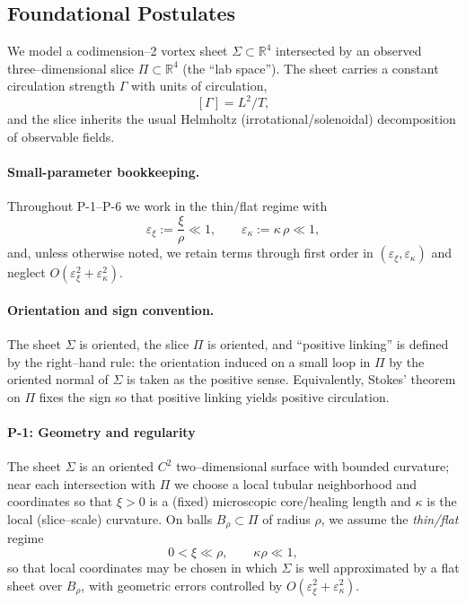 \subsection{Foundational Postulates}
\label{sec:foundational-postulates}

We model a codimension–2 vortex sheet $\Sigma\subset\mathbb{R}^4$ intersected by an observed three–dimensional slice $\Pi\subset\mathbb{R}^4$ (the “lab space”). The sheet carries a constant circulation strength $\Gamma$ with units of circulation,
\[
[\Gamma]=L^2/T,
\]
and the slice inherits the usual Helmholtz (irrotational/solenoidal) decomposition of observable fields.

\paragraph*{Small-parameter bookkeeping.}
Throughout P-1–P-6 we work in the thin/flat regime with
\[
\varepsilon_\xi := \frac{\xi}{\rho}\ll 1,\qquad
\varepsilon_\kappa := \kappa\,\rho \ll 1,
\]
and, unless otherwise noted, we retain terms through first order in $(\varepsilon_\xi,\varepsilon_\kappa)$ and neglect $O(\varepsilon_\xi^2+\varepsilon_\kappa^2)$.

\paragraph*{Orientation and sign convention.}
The sheet $\Sigma$ is oriented, the slice $\Pi$ is oriented, and “positive linking'' is defined by the right–hand rule: the orientation induced on a small loop in $\Pi$ by the oriented normal of $\Sigma$ is taken as the positive sense. Equivalently, Stokes' theorem on $\Pi$ fixes the sign so that positive linking yields positive circulation.

\paragraph{P-1: Geometry and regularity}
\label{post:P1}
The sheet $\Sigma$ is an oriented $C^2$ two–dimensional surface with bounded curvature; near each intersection with $\Pi$ we choose a local tubular neighborhood and coordinates so that $\xi>0$ is a (fixed) microscopic core/healing length and $\kappa$ is the local (slice–scale) curvature. On balls $B_\rho\subset\Pi$ of radius $\rho$, we assume the \emph{thin/flat} regime
\[
0<\xi \ll \rho, \qquad \kappa\rho \ll 1,
\]
so that local coordinates may be chosen in which $\Sigma$ is well approximated by a flat sheet over $B_\rho$, with geometric errors controlled by $O(\varepsilon_\xi^2+\varepsilon_\kappa^2)$.

